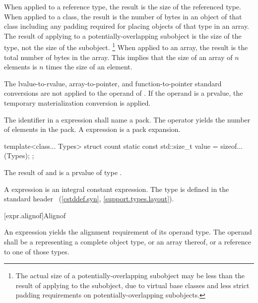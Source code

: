 \pnum
{}%
When applied to a reference type, the result is the size
of the referenced type.
%
When applied to a class, the result is the number of bytes in an object
of that class including any padding required for placing objects of that
type in an array.
The result of applying  to a
potentially-overlapping subobject is
the size of the type, not the size of the subobject.%
\footnote{The actual size of a potentially-overlapping subobject
may be less than the result of
applying  to the subobject, due to virtual base classes
and less strict padding requirements on potentially-overlapping subobjects.}
%
When applied to an array, the result is the total number of bytes in the
array. This implies that the size of an array of $n$ elements is
$n$ times the size of an element.

\pnum
The lvalue-to-rvalue,
array-to-pointer, and
function-to-pointer standard conversions are not
applied to the operand of .
If the operand is a prvalue,
the temporary materialization conversion
is applied.

\pnum
The identifier in a  expression shall name a
pack. The  operator yields the number of elements
in the pack.
A  expression is a pack expansion.
\begin{example}
\begin{codeblock}
template<class... Types>
struct count {
  static const std::size_t value = sizeof...(Types);
};
\end{codeblock}
\end{example}

\pnum
{}%
%
The result of  and  is a prvalue of type
.
\begin{note}
A  expression
is an integral constant expression.
The type  is defined in the standard header
~(\ref{cstddef.syn}, \ref{support.types.layout}).
\end{note}

[expr.alignof]{Alignof}

\pnum
{}%
%
An  expression yields the alignment requirement
of its operand type. The operand shall be a 
representing a complete object type, or an array thereof, or a reference
to one of those types.

